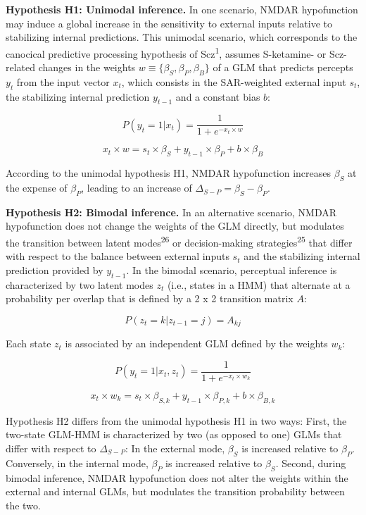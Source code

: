 \documentclass[
]{article}
\begin{document}
\textbf{Hypothesis H1: Unimodal inference.} In one scenario, NMDAR
hypofunction may induce a global increase in the sensitivity to external
inputs relative to stabilizing internal predictions. This unimodal
scenario, which corresponds to the canocical predictive processing
hypothesis of Scz\textsuperscript{1}, assumes S-ketamine- or Scz-related
changes in the weights \(w \equiv \{\beta_S, \beta_P, \beta_B\}\) of a
GLM that predicts percepts \(y_t\) from the input vector \(x_t\), which
consists in the SAR-weighted external input \(s_t\), the stabilizing
internal prediction \(y_{t-1}\) and a constant bias \(b\):

\[
P(y_t = 1 | x_t) = \frac{1}{1 + e^{-x_t \times w}} 
\]

\[
x_t \times w =  s_t \times \beta_S + y_{t-1} \times \beta_P  + b \times \beta_B  
\]

According to the unimodal hypothesis H1, NMDAR hypofunction increases
\(\beta_S\) at the expense of \(\beta_P\), leading to an increase of
\(\Delta_{S-P} = \beta_S - \beta_P\).

\textbf{Hypothesis H2: Bimodal inference.} In an alternative scenario,
NMDAR hypofunction does not change the weights of the GLM directly, but
modulates the transition between latent modes\textsuperscript{26} or
decision-making strategies\textsuperscript{25} that differ with respect
to the balance between external inputs \(s_t\) and the stabilizing
internal prediction provided by \(y_{t-1}\). In the bimodal scenario,
perceptual inference is characterized by two latent modes \(z_t\) (i.e.,
states in a HMM) that alternate at a probability per overlap that is
defined by a 2 x 2 transition matrix \(A\):

\[
P(z_t = k|z_{t-1} = j) = A_{kj} 
\]

Each state \(z_t\) is associated by an independent GLM defined by the
weights \(w_k\):

\[
P(y_t = 1 | x_t, z_t) = \frac{1}{1 + e^{-x_t \times w_k}} 
\]

\[
x_t \times w_k =  s_t \times \beta_{S,k} + y_{t-1} \times \beta_{P,k}  + b \times \beta_{B,k}  
\]

Hypothesis H2 differs from the unimodal hypothesis H1 in two ways:
First, the two-state GLM-HMM is characterized by two (as opposed to one)
GLMs that differ with respect to \(\Delta_{S-P}\): In the external mode,
\(\beta_S\) is increased relative to \(\beta_P\). Conversely, in the
internal mode, \(\beta_P\) is increased relative to \(\beta_S\). Second,
during bimodal inference, NMDAR hypofunction does not alter the weights
within the external and internal GLMs, but modulates the transition
probability between the two.
\end{document}
